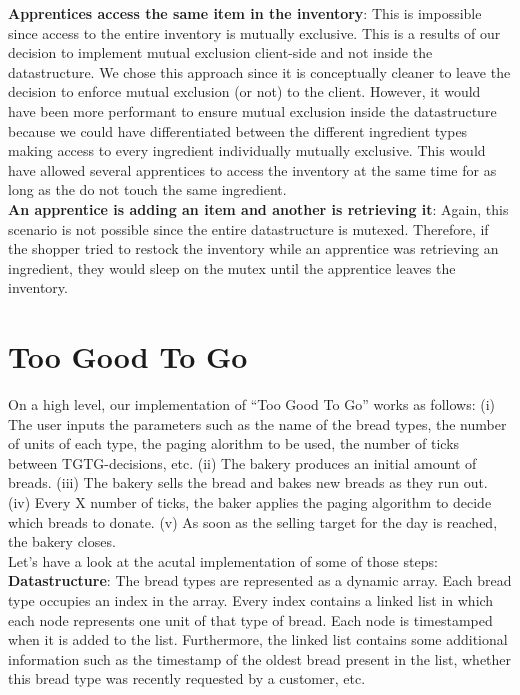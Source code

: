 \documentclass[11pt]{article}
\begin{document}
\textbf{Apprentices access the same item in the inventory}: This is impossible since access to the entire inventory is mutually exclusive. This is a results of our decision to implement mutual exclusion client-side and not inside the datastructure. We chose this approach since it is conceptually cleaner to leave the decision to enforce mutual exclusion (or not) to the client. However, it would have been more performant to ensure mutual exclusion inside the datastructure because we could have differentiated between the different ingredient types making access to every ingredient individually mutually exclusive. This would have allowed several apprentices to access the inventory at the same time for as long as the do not touch the same ingredient.\\

\textbf{An apprentice is adding an item and another is retrieving it}: Again, this scenario is not possible since the entire datastructure is mutexed. Therefore, if the shopper tried to restock the inventory while an apprentice was retrieving an ingredient, they would sleep on the mutex until the apprentice leaves the inventory.\\

\section{Too Good To Go}
\label{sec:org8e7b3ca}

On a high level, our implementation of ``Too Good To Go'' works as follows: (i) The user inputs the parameters such as the name of the bread types, the number of units of each type, the paging alorithm to be used, the number of ticks between TGTG-decisions, etc. (ii) The bakery produces an initial amount of breads. (iii) The bakery sells the bread and bakes new breads as they run out. (iv) Every X number of ticks, the baker applies the paging algorithm to decide which breads to donate. (v) As soon as the selling target for the day is reached, the bakery closes.\\

Let's have a look at the acutal implementation of some of those steps:\\

\textbf{Datastructure}: The bread types are represented as a dynamic array. Each bread type occupies an index in the array. Every index contains a linked list in which each node represents one unit of that type of bread. Each node is timestamped when it is added to the list. Furthermore, the linked list contains some additional information such as the timestamp of the oldest bread present in the list, whether this bread type was recently requested by a customer, etc.\\
\end{document}
